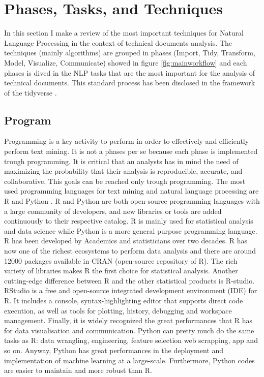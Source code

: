 \documentclass[]{book}
\begin{document}
\chapter{Phases, Tasks, and Techniques}\label{sotatools}

In this section I make a review of the most important techniques for
Natural Language Processing in the context of technical documents
analysis. The techniques (mainly algorithms) are grouped in phases
(Import, Tidy, Transform, Model, Visualize, Communicate) showed in
figure \ref{fig:mainworkflow} and each phases is dived in the NLP tasks
that are the most important for the analysis of technical documents.
This standard process has been disclosed in the framework of the
tidyverse \citep{wickham2016r}.

\section{Program}\label{sotatoolsprogram}

Programming is a key activity to perform in order to effectively and
efficiently perform text mining. It is not a phases per se because each
phase is implemented trough programming. It is critical that an analysts
has in mind the need of maximizing the probability that their analysis
is reproducible, accurate, and collaborative. This goals can be reached
only trough programming. The most used programming languages for text
mining and natural language processing are R \citep{r2008} and Python
\citep{py95}. R and Python are both open-source programming languages
with a large community of developers, and new libraries or tools are
added continuously to their respective catalog. R is mainly used for
statistical analysis and data science while Python is a more general
purpose programming language. R has been developed by Academics and
statisticians over two decades. R has now one of the richest ecosystems
to perform data analysis and there are around 12000 packages available
in CRAN (open-source repository of R). The rich variety of libraries
makes R the first choice for statistical analysis. Another cutting-edge
difference between R and the other statistical products is R-studio.
RStudio is a free and open-source integrated development environment
(IDE) for R. It includes a console, syntax-highlighting editor that
supports direct code execution, as well as tools for plotting, history,
debugging and workspace management. Finally, it is widely recognized the
great performances that R has for data visualisation and communication.
Python can pretty much do the same tasks as R: data wrangling,
engineering, feature selection web scrapping, app and so on. Anyway,
Python has great performances in the deployment and implementation of
machine learning at a large-scale. Furthermore, Python codes are easier
to maintain and more robust than R.
\end{document}
